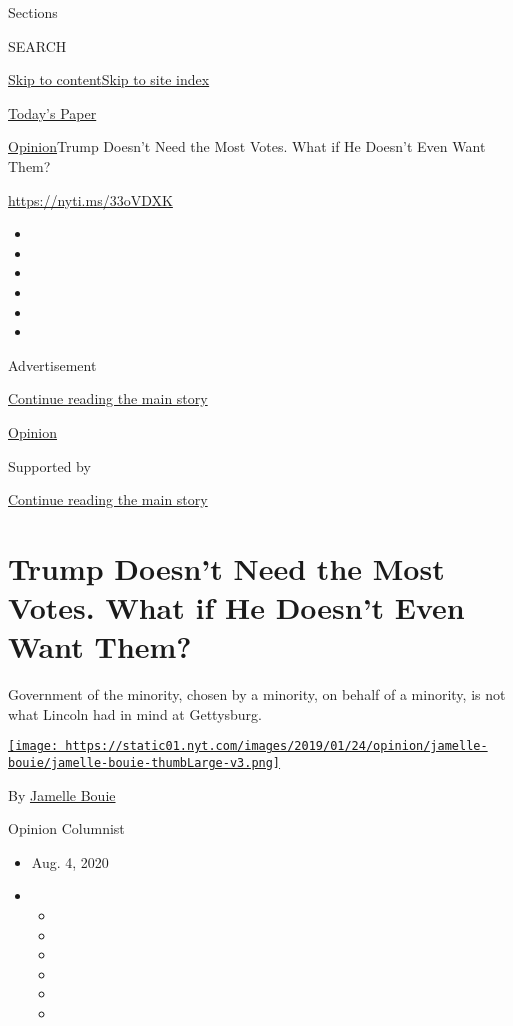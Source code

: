 Sections

SEARCH

\protect\hyperlink{site-content}{Skip to
content}\protect\hyperlink{site-index}{Skip to site index}

\href{https://myaccount.nytimes.com/auth/login?response_type=cookie\&client_id=vi}{}

\href{https://www.nytimes.com/section/todayspaper}{Today's Paper}

\href{/section/opinion}{Opinion}\textbar{}Trump Doesn't Need the Most
Votes. What if He Doesn't Even Want Them?

\url{https://nyti.ms/33oVDXK}

\begin{itemize}
\item
\item
\item
\item
\item
\item
\end{itemize}

Advertisement

\protect\hyperlink{after-top}{Continue reading the main story}

\href{/section/opinion}{Opinion}

Supported by

\protect\hyperlink{after-sponsor}{Continue reading the main story}

\hypertarget{trump-doesnt-need-the-most-votes-what-if-he-doesnt-even-want-them}{%
\section{Trump Doesn't Need the Most Votes. What if He Doesn't Even Want
Them?}\label{trump-doesnt-need-the-most-votes-what-if-he-doesnt-even-want-them}}

Government of the minority, chosen by a minority, on behalf of a
minority, is not what Lincoln had in mind at Gettysburg.

\href{https://www.nytimes.com/column/jamelle-bouie}{\texttt{[image: https://static01.nyt.com/images/2019/01/24/opinion/jamelle-bouie/jamelle-bouie-thumbLarge-v3.png]}}

By \href{https://www.nytimes.com/column/jamelle-bouie}{Jamelle Bouie}

Opinion Columnist

\begin{itemize}
\item
  Aug. 4, 2020
\item
  \begin{itemize}
  \item
  \item
  \item
  \item
  \item
  \item
  \end{itemize}
\end{itemize}

